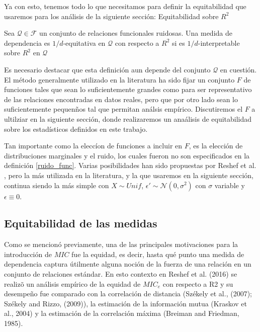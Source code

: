 	Ya con esto, tenemos todo lo que necesitamos para definir la equitabilidad que usaremos para los an\'alisis de la siguiente secci\'on: Equitabilidad sobre $R^2$

	\begin{defn}
		Sea $\mathcal{Q}\in\mathcal{F}$ un conjunto de relaciones funcionales ruidosas. Una medida de dependencia es $1/d$-equitativa en $\mathcal{Q}$ con respecto a $R^2$ si es $1/d$-interpretable sobre $R^2$ en $\mathcal{Q}$ 
	\end{defn}

	Es necesario destacar que esta definici\'on aun depende del conjunto $\mathcal{Q}$ en cuesti\'on. El m\'etodo generalmente utilizado en la literatura ha sido fijar un conjunto $F$ de funciones tales que sean lo suficientemente grandes como para ser representativo de las relaciones encontradas en datos reales, pero que por otro lado sean lo suficientemente pequen\~nos tal que permitan an\'alsis emp\'irico. Discutiremos el $F$ a ultilziar en la siguiente secci\'on, donde realizaremos un ana\'alisis de equitabilidad sobre los estad\'isticos definidos en este trabajo.

	Tan importante como la elecc\'ion de funciones a incluir en $F$, es la elecci\'on de distribuciones marginales y el ruido, los cuales fueron no son especificados en la definici\'on \ref{ruido_func}. Varias posibilidades han sido propuestas por Reshef et al. \cite{Reshef2015a}, pero la m\'as utilizada en la literatura, y la que usaremos en la siguiente secci\'on, continua siendo la m\'as simple con $X\sim Unif$, $\epsilon\prime\sim\mathcal{N}(0,\sigma^2)$ con $\sigma$ variable y $\epsilon\equiv0$. 

	
	\subsection[equitabilidadmice]{Equitabilidad de las medidas}

	
	Como se mencion\'o previamente, una de las principales motivaciones para la introducci\'on de $MIC$ fue la equidad, es decir, hasta qu\'e punto una medida de dependencia captura \'utilmente alguna noci\'on de la fuerza de una relaci\'on en un conjunto de relaciones est\'andar. En esto contexto en Reshef et al. (2016) \cite{Reshef2016} se realiz\~o un an\'alisis emp\'irico de la equidad de $MIC_e$ con respecto a R2 y su desempe\~no fue comparado con la correlaci\'on de distancia (Sz\'ekely et al., (2007)\cite{Szekely2007}; Sz\'ekely and Rizzo, (2009)\cite{Szekely2009}), la estimaci\'on de la informaci\'on mutua (Kraskov et al., 2004) y la estimaci\'on de la correlaci\'on m\'axima (Breiman and Friedman, 1985).

